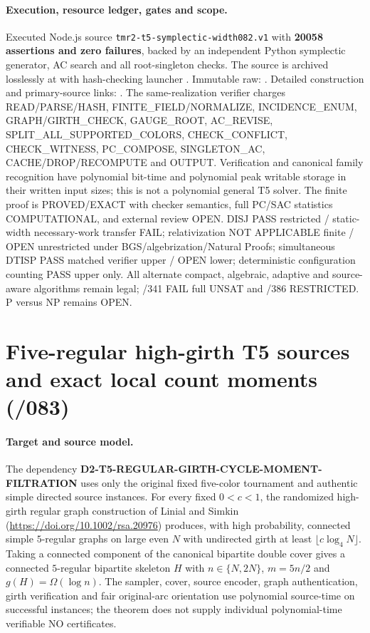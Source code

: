 \documentclass[11pt]{article}
\begin{document}
\paragraph{Execution, resource ledger, gates and scope.}
Executed Node.js source
\texttt{tmr2-t5-symplectic-width082.v1} with
\textbf{20058 assertions and zero failures}, backed by an
independent Python symplectic generator, AC search and all
root-singleton checks. The source is archived losslessly at
with hash-checking launcher
.
Immutable raw:
.
Detailed construction and primary-source links:
.
The same-realization verifier charges READ/PARSE/HASH,
FINITE_FIELD/NORMALIZE, INCIDENCE_ENUM, GRAPH/GIRTH_CHECK,
GAUGE_ROOT, AC_REVISE, SPLIT_ALL_SUPPORTED_COLORS,
CHECK_CONFLICT, CHECK_WITNESS, PC_COMPOSE, SINGLETON_AC,
CACHE/DROP/RECOMPUTE and OUTPUT. Verification and canonical
family recognition have polynomial bit-time and polynomial
peak writable storage in their written input sizes;
this is not a polynomial general T5 solver.
The finite proof is PROVED/EXACT with checker semantics,
full PC/SAC statistics COMPUTATIONAL, and external review
OPEN. DISJ PASS restricted / static-width necessary-work
transfer FAIL; relativization NOT APPLICABLE finite /
OPEN unrestricted under BGS/algebrization/Natural Proofs;
simultaneous DTISP PASS matched verifier upper /
OPEN lower; deterministic configuration counting PASS
upper only. All alternate compact, algebraic, adaptive
and source-aware algorithms remain legal; /341 FAIL full
UNSAT and /386 RESTRICTED. P versus NP remains OPEN.

\section{Five-regular high-girth T5 sources and exact local count moments (/083)}
\paragraph{Target and source model.}
The dependency \textbf{D2-T5-REGULAR-GIRTH-CYCLE-MOMENT-FILTRATION}
uses only the original fixed five-color tournament and authentic simple
directed source instances. For every fixed $0<c<1$, the randomized
high-girth regular graph construction of Linial and Simkin
(\url{https://doi.org/10.1002/rsa.20976}) produces, with high probability,
connected simple $5$-regular graphs on large even $N$ with undirected
girth at least $\lfloor c\log_4 N\rfloor$.
Taking a connected component of the canonical bipartite double cover
gives a connected $5$-regular bipartite skeleton $H$ with
$n\in\{N,2N\}$, $m=5n/2$ and $g(H)=\Omega(\log n)$.
The sampler, cover, source encoder, graph authentication, girth
verification and fair original-arc orientation use polynomial
source-time on successful instances; the theorem does not supply
individual polynomial-time verifiable NO certificates.
\end{document}
